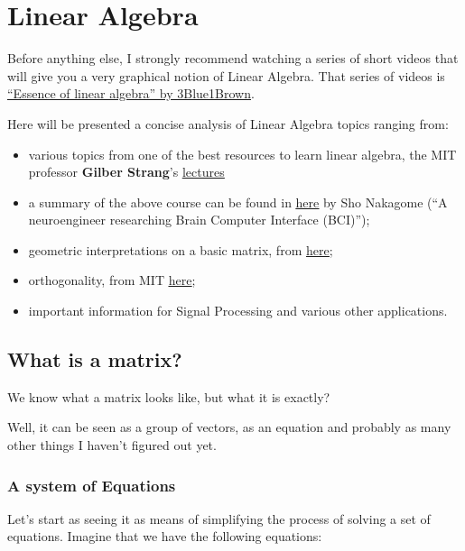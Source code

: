 \section{Linear Algebra}
\par Before anything else, I strongly recommend watching a series of short videos that will give you a very graphical notion of Linear Algebra. That series of videos is \href{https://www.youtube.com/watch?v=fNk_zzaMoSs&list=PLZHQObOWTQDPD3MizzM2xVFitgF8hE_ab&index=1}{\uline{“Essence of linear algebra” by 3Blue1Brown}}.

\vspace{1cm}
\par Here will be presented a concise analysis of Linear Algebra topics ranging from:
\begin{itemize}
    \item various topics from one of the best resources to learn linear algebra, the MIT professor \textbf{Gilber Strang}'s \href{https://ocw.mit.edu/courses/mathematics/18-06-linear-algebra-spring-2010/video-lectures/}{\uline{lectures}}
    \item a summary of the above course can be found in \href{https://medium.com/sho-jp/towards-understanding-linear-algebra-part-1-d43710535503}{\ul{here}}
    by Sho Nakagome (``A neuroengineer researching Brain Computer Interface (BCI)'');
    \item geometric interpretations on a basic matrix, from \href{https://www.coranac.com/documents/geomatrix/}{\ul{here}};
    \item orthogonality, from MIT \href{https://ocw.mit.edu/courses/mathematics/18-06sc-linear-algebra-fall-2011/least-squares-determinants-and-eigenvalues/orthogonal-vectors-and-subspaces/MIT18_06SCF11_Ses2.1sum.pdf}{\ul{here}};
    \item important information for Signal Processing and various other applications.
\end{itemize}


\subsection{What is a matrix?}
\par We know what a matrix looks like, but what it is exactly? 
\par Well, it can be seen as a group of vectors, as an equation and probably as many other things I haven't figured out yet.

\subsubsection{A system of Equations}
\par Let's start as seeing it as means of simplifying the process of solving a set of equations. Imagine that we have the following equations:

